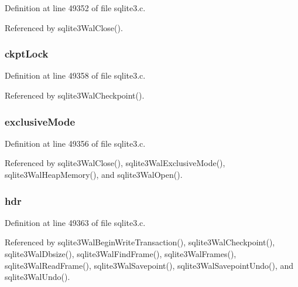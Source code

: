 Definition at line 49352 of file sqlite3.\+c.



Referenced by sqlite3\+Wal\+Close().

\hypertarget{struct_wal_af145362fcbabd01f23d11f7a1906aca8}{}
\subsubsection[{ckpt\+Lock}]{ ckpt\+Lock}\label{struct_wal_af145362fcbabd01f23d11f7a1906aca8}


Definition at line 49358 of file sqlite3.\+c.



Referenced by sqlite3\+Wal\+Checkpoint().

\hypertarget{struct_wal_a97470c2be335613df4fd3af652fa60dc}{}
\subsubsection[{exclusive\+Mode}]{ exclusive\+Mode}\label{struct_wal_a97470c2be335613df4fd3af652fa60dc}


Definition at line 49356 of file sqlite3.\+c.



Referenced by sqlite3\+Wal\+Close(), sqlite3\+Wal\+Exclusive\+Mode(), sqlite3\+Wal\+Heap\+Memory(), and sqlite3\+Wal\+Open().

\hypertarget{struct_wal_aa5e86412b1010c9ee3a5793bb974b50f}{}
\subsubsection[{hdr}]{ hdr}\label{struct_wal_aa5e86412b1010c9ee3a5793bb974b50f}


Definition at line 49363 of file sqlite3.\+c.



Referenced by sqlite3\+Wal\+Begin\+Write\+Transaction(), sqlite3\+Wal\+Checkpoint(), sqlite3\+Wal\+Dbsize(), sqlite3\+Wal\+Find\+Frame(), sqlite3\+Wal\+Frames(), sqlite3\+Wal\+Read\+Frame(), sqlite3\+Wal\+Savepoint(), sqlite3\+Wal\+Savepoint\+Undo(), and sqlite3\+Wal\+Undo().

